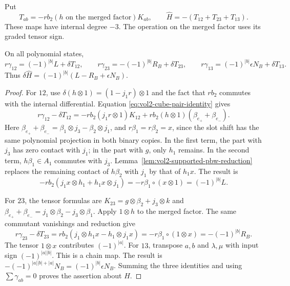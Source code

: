 Put
\begin{equation}\label{eq:vol2-cube-transfer-homotopy}
 T_{ab}=-r b_2(h\text{ on the merged factor})K_{ab},
 \qquad \widehat H=-(T_{12}+T_{23}+T_{13}).
\end{equation}
These maps have internal degree $-3$. The operation on the
merged factor uses its graded tensor sign.

\begin{proposition}\label{prop:vol2-cube-state-comparison}
On all polynomial states,
\[
 r\gamma_{12}=(-1)^{|b|}L+\delta T_{12},\qquad
 r\gamma_{23}=-(-1)^{|b|}R_B+\delta T_{23},\qquad
 r\gamma_{13}=(-1)^{|b|}\epsilon N_B+\delta T_{13}.
\]
Thus $\delta\widehat H=(-1)^{|b|}(L-R_B+\epsilon N_B)$.
\end{proposition}

\begin{proof}
For $12$, use $\delta(h\otimes1)=(1-j_1r)\otimes1$
and the fact that $rb_2$ commutes with the internal
differential. Equation \eqref{eq:vol2-cube-pair-identity}
gives
\[
 r\gamma_{12}-\delta T_{12}
 =-rb_2(j_1r\otimes1)K_{12}
   +rb_2(h\otimes1)(\beta_{e_+}+\beta_{e_-}).
\]
Here $\beta_{e_+}+\beta_{e_-}=
\beta_1\otimes j_3-\beta_2\otimes j_1$, and
$r\beta_1=r\beta_2=x$, since the slot shift has the same
polynomial projection in both binary copies. In the first
term, the part with $j_3$ has zero contact with $j_1$;
in the part with $g$, only $h_1$ remains. In the second term,
$h\beta_1\in A_1$ commutes with $j_3$.
Lemma~\ref{lem:vol2-supported-pbw-reduction} replaces the
remaining contact of $h\beta_2$ with $j_1$ by that of
$h_1x$. The result is
\[
 -rb_2(j_1x\otimes h_1+h_1x\otimes j_1)
       =-r\beta_1\circ(x\otimes1)=(-1)^{|b|}L.
\]

For $23$, the tensor formulas are
$K_{23}=g\otimes\beta_2+j_3\otimes k$ and
$\beta_{e_+}+\beta_{e_-}=j_1\otimes\beta_2-j_3\otimes\beta_1$.
Apply $1\otimes h$ to the merged factor. The same commutant
vanishings and reduction give
\[
 r\gamma_{23}-\delta T_{23}
 =rb_2(j_1\otimes h_1x-h_1\otimes j_1x)
 =-r\beta_1\circ(1\otimes x)=-(-1)^{|b|}R_B.
\]
The tensor $1\otimes x$ contributes $(-1)^{|a|}$.
For $13$, transpose $a,b$ and $\lambda,\mu$ with input sign
$(-1)^{|a||b|}$. This is a chain map. The result is
$-(-1)^{|a||b|+|a|}N_B=(-1)^{|b|}\epsilon N_B$.
Summing the three identities and using $\sum\gamma_{ab}=0$
proves the assertion about $\widehat H$.
\end{proof}

